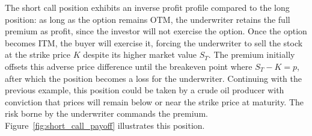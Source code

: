 \documentclass[english,12pt,a4paper,pdftex,sci,utf8]{aaltothesis}
\begin{document}
The short call position exhibits an inverse profit profile compared to the long position: as long as the option remains OTM, the underwriter retains the full premium as profit, since the investor will not exercise the option. Once the option becomes ITM, the buyer will exercise it, forcing the underwriter to sell the stock at the strike price $K$ despite its higher market value $S_T$. The premium initially offsets this adverse price difference until the breakeven point where $S_T-K=p$, after which the position becomes a loss for the underwriter. Continuing with the previous example, this position could be taken by a crude oil producer with conviction that prices will remain below or near the strike price at maturity. The risk borne by the underwriter commands the premium. Figure~\ref{fig:short_call_payoff} illustrates this position.
\end{document}
